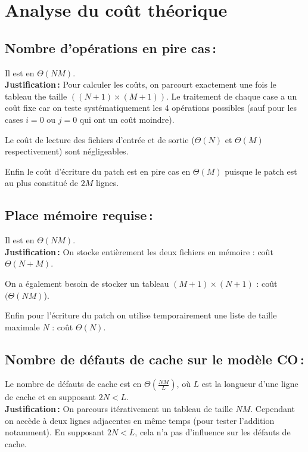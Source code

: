 \documentclass[a4paper, 10pt, french]{article}
\begin{document}
\section{Analyse du coût théorique}

  \subsection{Nombre  d'opérations en pire cas\,: }
    Il est en $\Theta(NM)$.\\

    \textbf{Justification\,:} Pour calculer les coûts, on parcourt exactement une fois le tableau the taille $((N+1)\times(M+1))$.
    Le traitement de chaque case a un coût fixe car on teste systématiquement les 4 opérations possibles (sauf pour les cases $i=0$ ou $j=0$ qui ont un coût moindre).

    Le coût de lecture des fichiers d'entrée et de sortie ($\Theta(N)$ et $\Theta(M)$ respectivement) sont négligeables.

    Enfin le coût d'écriture du patch est en pire cas en $\Theta(M)$ puisque le patch est au plus constitué de $2M$ lignes.

  \subsection{Place mémoire requise\,: }
    Il est en $\Theta(NM)$.\\

    \textbf{Justification\,:} On stocke entièrement les deux fichiers en mémoire : coût $\Theta(N+M)$.

    On a également besoin de stocker un tableau $(M+1)\times(N+1)$ : coût $(\Theta(NM)$).

    Enfin pour l'écriture du patch on utilise temporairement une liste de taille maximale $N$ : coût $\Theta(N)$.

  \subsection{Nombre de défauts de cache sur le modèle CO\,: }
  	Le nombre de défauts de cache est en $\Theta \left (\frac{NM}{L} \right )$, où $L$ est la longueur d'une ligne de cache et en supposant $2N < L$.\\
  	
     \textbf{Justification\,:} On parcours itérativement un tableau de taille $NM$. Cependant on accède à deux lignes adjacentes en même temps (pour tester l'addition notamment). En supposant $2N < L$, cela n'a pas d'influence sur les défauts de cache.
\end{document}
